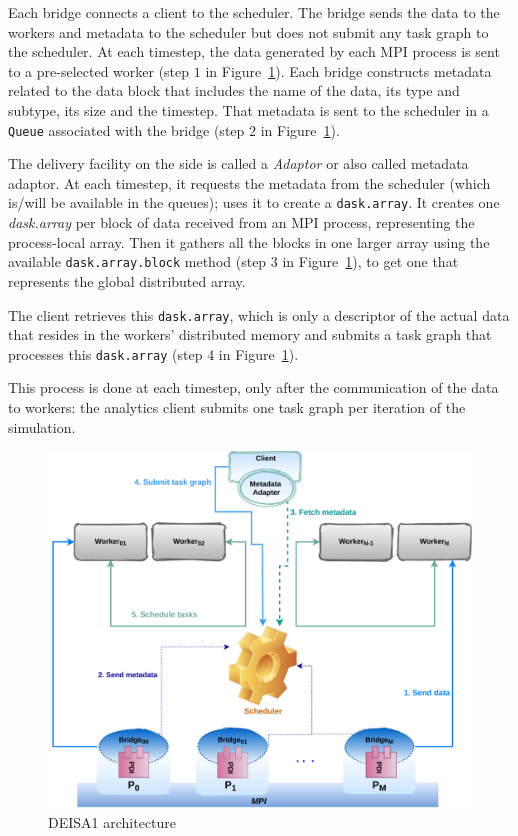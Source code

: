 Each bridge connects a \dask client to the scheduler. The bridge sends the data to the workers and metadata to the scheduler but does not submit any task graph to the scheduler. 
At each timestep, the data generated by each MPI process is sent to a pre-selected \dask worker (step $1$ in Figure~\ref{figdeida}). Each bridge constructs  metadata related to the data block that includes the name of the data, its type and subtype, its size and the timestep. That metadata is sent to the scheduler in a \dask \texttt{Queue} associated with the bridge (step $2$ in Figure~\ref{figdeida}). 

The delivery facility on the \dask side is called a \deisa \textit{Adaptor} or also called metadata adaptor. At each timestep, it requests the metadata from the scheduler (which is/will be available in the queues); uses it to create a \texttt{dask.array}. It creates one \textit{dask.array} per block of data received from an MPI process, representing the process-local array. Then it gathers all the blocks in one larger array using the available \texttt{dask.array.block} method (step $3$ in Figure~\ref{figdeida}), to get one that represents the global distributed array.  

The client retrieves this \texttt{dask.array}, which is only a descriptor of the actual data that resides in the workers' distributed memory and submits a task graph that processes this \texttt{dask.array} (step $4$ in Figure~\ref{figdeida}). 

This process is done at each timestep, only after the communication of the data to \dask workers: the analytics client submits one task graph per iteration of the simulation.  


\begin{figure}[h]\centering
\includegraphics[width=\columnwidth]{figures/DeisaV1.pdf}
\caption{DEISA1 architecture}
\label{figdeida}
\end{figure}


